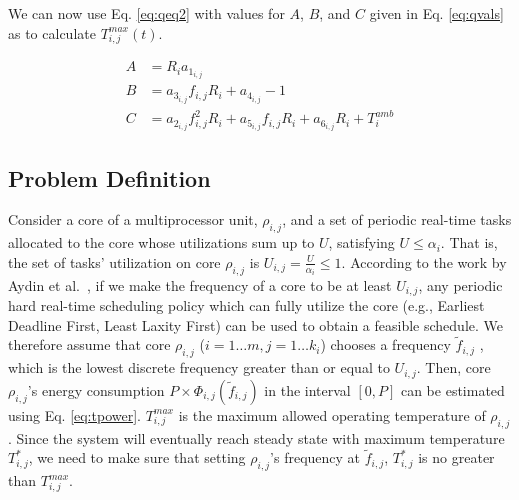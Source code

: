 \documentclass[conference]{IEEEtran}
\newtheorem{proposition}{Proposition}
\begin{document}
We can now use Eq. \ref{eq:qeq2} with values for $A$, $B$, and $C$ given in Eq. \ref{eq:qvals} as to calculate $T^{max}_{i,j}(t)$.

\begin{subequations} \label{eq:qvals}
	\begin{align}
		A &= R_ia_{1_{i,j}}\\
		B &= a_{3_{i,j}}f_{i,j}R_i + a_{4_{i,j}} - 1\\
		C &= a_{2_{i,j}}f^{2}_{i,j}R_i + a_{5_{i,j}}f_{i,j}R_i + a_{6_{i,j}}R_i + T_i^{amb}
	\end{align}
\end{subequations}

\subsection{Problem Definition}
\label{sec:pd}

Consider a core of a multiprocessor unit, $\rho_{i,j}$, and a set of periodic real-time tasks allocated to the core whose utilizations sum up to $U$, satisfying $U \leq \alpha_i$. That is, the set of tasks' utilization on core $\rho_{i,j}$ is $U_{i,j} = \frac{U}{\alpha_i} \leq 1$.    
%
%
According to the work by Aydin et al.~\cite{Aydin01}, if we make the frequency of a core to be at least $U_{i,j}$, any periodic hard real-time scheduling policy which can fully utilize the core (e.g., Earliest Deadline First, Least Laxity First) can be used to obtain a feasible schedule.
We therefore assume that core $\rho_{i,j}$ ($i=1 \ldots m, j=1 \ldots k_i$) chooses a frequency $\tilde{f}_{i,j}$ , which is the lowest discrete frequency  greater than or equal to $U_{i,j}$. Then, core $\rho_{i,j}$'s energy consumption  $P \times \Phi_{i,j}(\tilde{f}_{i,j})$ in the interval $[0,P]$ can be estimated using Eq. \ref{eq:tpower}. 
$T^{max}_{i,j}$ is the maximum allowed operating temperature of $\rho_{i,j}$.
Since the system will eventually reach  steady state with maximum temperature $T^*_{i,j}$, we need to make sure that setting $\rho_{i,j}$'s frequency at $\tilde{f}_{i,j}$, $T^*_{i,j}$ is no greater than $T^{max}_{i,j}$. 
\end{document}
